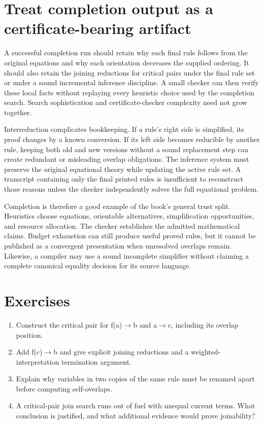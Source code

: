 \section{Treat completion output as a certificate-bearing artifact}
\label{sec:ch84-certificates}
A successful completion run should retain why each final rule follows from the original equations and why each orientation decreases the supplied ordering.
It should also retain the joining reductions for critical pairs under the final rule set or under a sound incremental inference discipline.
A small checker can then verify these local facts without replaying every heuristic choice used by the completion search.
Search sophistication and certificate-checker complexity need not grow together.

Interreduction complicates bookkeeping.
If a rule's right side is simplified, its proof changes by a known conversion.
If its left side becomes reducible by another rule, keeping both old and new versions without a sound replacement step can create redundant or misleading overlap obligations.
The inference system must preserve the original equational theory while updating the active rule set.
A transcript containing only the final printed rules is insufficient to reconstruct those reasons unless the checker independently solves the full equational problem.

Completion is therefore a good example of the book's general trust split.
Heuristics choose equations, orientable alternatives, simplification opportunities, and resource allocation.
The checker establishes the admitted mathematical claims.
Budget exhaustion can still produce useful proved rules, but it cannot be published as a convergent presentation when unresolved overlaps remain.
Likewise, a compiler may use a sound incomplete simplifier without claiming a complete canonical equality decision for its source language.

\section{Exercises}
\label{sec:ch84-exercises}
\begin{enumerate}
\item\label{ex:ch84-peak} Construct the critical pair for f(a)$\to$b and a$\to$c, including its overlap position.
\item\label{ex:ch84-repair} Add f(c)$\to$b and give explicit joining reductions and a weighted-interpretation termination argument.
\item\label{ex:ch84-apart} Explain why variables in two copies of the same rule must be renamed apart before computing self-overlaps.
\item\label{ex:ch84-budget} A critical-pair join search runs out of fuel with unequal current terms.
What conclusion is justified, and what additional evidence would prove joinability?
\end{enumerate}

